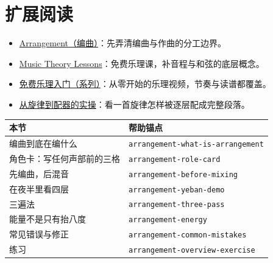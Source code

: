\section{扩展阅读}
\label{sec:01-overview-further-reading}
\begin{itemize}
  \item \href{https://en.wikipedia.org/wiki/Arrangement}{Arrangement（编曲）}：先弄清编曲与作曲的分工边界。
  \item \href{https://www.musictheory.net/lessons}{Music Theory Lessons}：免费乐理课，补音程与和弦的底层概念。
  \item \href{https://www.youtube.com/watch?v=6gHEIF0rT2w}{免费乐理入门（系列）}：从零开始的乐理视频，节奏与读谱都覆盖。
  \item \href{https://www.youtube.com/watch?v=Mf6ZKAV0ZU4}{从旋律到配器的实操}：看一首旋律怎样被逐层配成完整段落。
\end{itemize}

\begin{helpmapping}
\begin{longtable}{p{}p{}}
\toprule
本节 & 帮助锚点 \\
\midrule
编曲到底在编什么 & \texttt{arrangement-what-is-arrangement} \\
角色卡：写任何声部前的三格 & \texttt{arrangement-role-card} \\
先编曲，后混音 & \texttt{arrangement-before-mixing} \\
在夜半里看四层 & \texttt{arrangement-yeban-demo} \\
三遍法 & \texttt{arrangement-three-pass} \\
能量不是只有抬八度 & \texttt{arrangement-energy} \\
常见错误与修正 & \texttt{arrangement-common-mistakes} \\
练习 & \texttt{arrangement-overview-exercise} \\
\bottomrule
\end{longtable}
\end{helpmapping}
